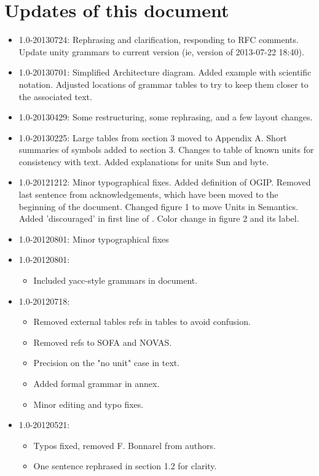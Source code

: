 \documentclass[11pt,notitlepage,onecolumn]{ivoa}
\begin{document}
\section{Updates of this document}
\begin{itemize}
\item 1.0-20130724: Rephrasing and clarification, responding to RFC
comments.  Update unity grammars to current version (ie, version of 2013-07-22 18:40).
\item 1.0-20130701: Simplified Architecture diagram. Added example
with scientific notation.  Adjusted locations of grammar tables to try
to keep them closer to the associated text.
\item 1.0-20130429: Some restructuring, some rephrasing, and a few layout changes.
\item 1.0-20130225: Large tables from section 3 moved to Appendix A. Short summaries of symbols added
to section 3. Changes to table of known units for consistency with text. Added explanations for units Sun and byte.  
\item 1.0-20121212:
Minor typographical fixes. Added definition of OGIP. Removed last sentence from acknowledgements, which have been moved to the beginning of the document. Changed figure 1 to move Units in Semantics. Added 'discouraged' in first line of . Color change in figure 2 and its label.
\item 1.0-20120801:
Minor typographical fixes
\item 1.0-20120801:
  \begin{itemize}
    \item Included yacc-style grammars in document.
    \end{itemize}
\item 1.0-20120718:
	\begin{itemize}
	\item Removed external tables refs in tables to avoid confusion.
	\item Removed refs to SOFA and NOVAS.
	\item Precision on the "no unit" case in text.
	\item Added formal grammar in annex.
	\item Minor editing and typo fixes.
	\end{itemize}
\item 1.0-20120521:
	\begin{itemize}
	\item Typos fixed, removed F. Bonnarel from authors. 
	\item One sentence rephrased in section 1.2 for clarity.

\end{itemize}
\end{itemize}
\end{document}
